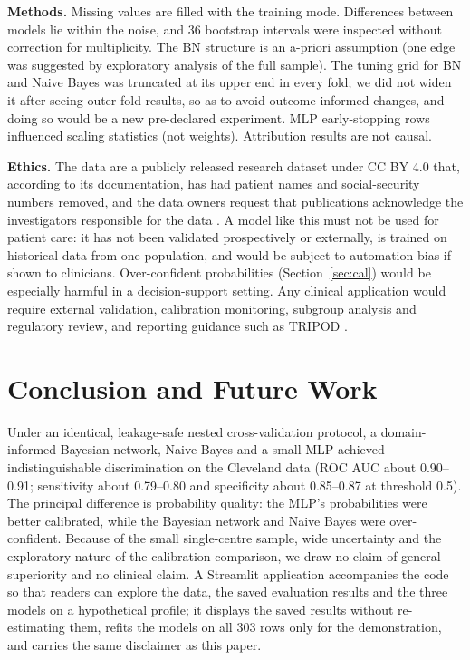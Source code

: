 \documentclass[conference]{IEEEtran}
\begin{document}
\textbf{Methods.} Missing values are filled with the training mode. Differences between models lie within the noise, and 36 bootstrap intervals were inspected without correction for multiplicity. The BN structure is an a-priori assumption (one edge was suggested by exploratory analysis of the full sample). The tuning grid for BN and Naive Bayes was truncated at its upper end in every fold; we did not widen it after seeing outer-fold results, so as to avoid outcome-informed changes, and doing so would be a new pre-declared experiment. MLP early-stopping rows influenced scaling statistics (not weights). Attribution results are not causal.

\textbf{Ethics.} The data are a publicly released research dataset under CC BY 4.0 that, according to its documentation, has had patient names and social-security numbers removed, and the data owners request that publications acknowledge the investigators responsible for the data \cite{uciheart,detrano1989}. A model like this must not be used for patient care: it has not been validated prospectively or externally, is trained on historical data from one population, and would be subject to automation bias if shown to clinicians. Over-confident probabilities (Section~\ref{sec:cal}) would be especially harmful in a decision-support setting. Any clinical application would require external validation, calibration monitoring, subgroup analysis and regulatory review, and reporting guidance such as TRIPOD \cite{collins2015}.

\section{Conclusion and Future Work}
Under an identical, leakage-safe nested cross-validation protocol, a domain-informed Bayesian network, Naive Bayes and a small MLP achieved indistinguishable discrimination on the Cleveland data (ROC AUC about 0.90--0.91; sensitivity about 0.79--0.80 and specificity about 0.85--0.87 at threshold 0.5). The principal difference is probability quality: the MLP's probabilities were better calibrated, while the Bayesian network and Naive Bayes were over-confident. Because of the small single-centre sample, wide uncertainty and the exploratory nature of the calibration comparison, we draw no claim of general superiority and no clinical claim. A Streamlit application accompanies the code so that readers can explore the data, the saved evaluation results and the three models on a hypothetical profile; it displays the saved results without re-estimating them, refits the models on all 303 rows only for the demonstration, and carries the same disclaimer as this paper.
\end{document}
